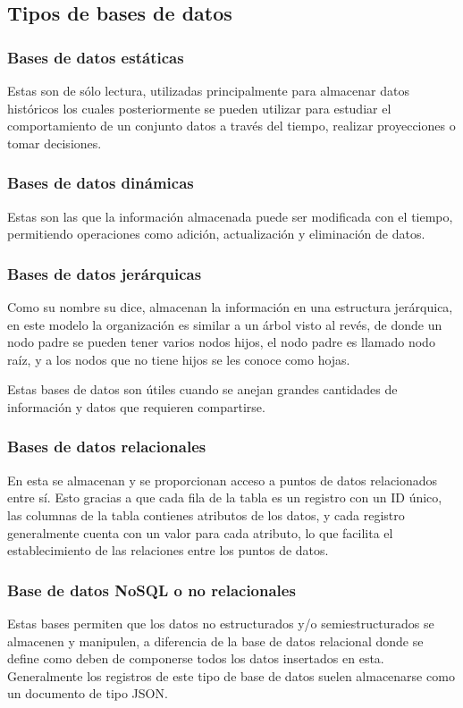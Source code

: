 \documentclass[12pt, a4paper, titlepage]{report}
\begin{document}
			\subsection{Tipos de bases de datos}
				\subsubsection{Bases de datos estáticas}
				Estas son de sólo lectura, utilizadas principalmente para almacenar datos históricos los cuales posteriormente se pueden utilizar para estudiar el comportamiento de un conjunto datos a través del tiempo, realizar proyecciones o tomar decisiones.\par
				\subsubsection{Bases de datos dinámicas}
				Estas son las que la información almacenada puede ser modificada con el tiempo, permitiendo operaciones como adición, actualización y eliminación de datos.\par
				\subsubsection{Bases de datos jerárquicas}
				Como su nombre su dice, almacenan la información en una estructura jerárquica, en este modelo la organización es similar a un árbol visto al revés, de donde un nodo padre se pueden tener varios nodos hijos, el nodo padre es llamado nodo raíz, y a los nodos que no tiene hijos se les conoce como hojas.\par
				Estas bases de datos son útiles cuando se anejan grandes cantidades de información y datos que requieren compartirse.\par
				\subsubsection{Bases de datos relacionales}
				En esta se almacenan y se proporcionan acceso a puntos de datos relacionados entre sí. Esto gracias a que cada fila de la tabla es un registro con un ID único, las columnas de la tabla contienes atributos de los datos, y cada registro generalmente cuenta con un valor para cada atributo, lo que facilita el establecimiento de las relaciones entre los puntos de datos.\par
				\subsubsection{Base de datos NoSQL o no relacionales}
				Estas bases permiten que los datos no estructurados y/o semiestructurados se almacenen y manipulen, a diferencia de la base de datos relacional donde se define como deben de componerse todos los datos insertados en esta. Generalmente los registros de este tipo de base de datos suelen almacenarse como un documento de tipo JSON.\par
\end{document}
